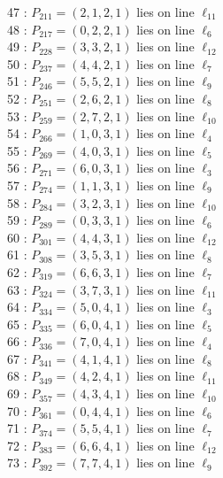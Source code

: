 \documentclass{article}
\begin{document}
{\begin{multicols}{2}
47 : $P_{211}=( 2, 1, 2, 1 )$ lies on line $\ell_{11}$\\
48 : $P_{217}=( 0, 2, 2, 1 )$ lies on line $\ell_{6}$\\
49 : $P_{228}=( 3, 3, 2, 1 )$ lies on line $\ell_{12}$\\
50 : $P_{237}=( 4, 4, 2, 1 )$ lies on line $\ell_{7}$\\
51 : $P_{246}=( 5, 5, 2, 1 )$ lies on line $\ell_{9}$\\
52 : $P_{251}=( 2, 6, 2, 1 )$ lies on line $\ell_{8}$\\
53 : $P_{259}=( 2, 7, 2, 1 )$ lies on line $\ell_{10}$\\
54 : $P_{266}=( 1, 0, 3, 1 )$ lies on line $\ell_{4}$\\
55 : $P_{269}=( 4, 0, 3, 1 )$ lies on line $\ell_{5}$\\
56 : $P_{271}=( 6, 0, 3, 1 )$ lies on line $\ell_{3}$\\
57 : $P_{274}=( 1, 1, 3, 1 )$ lies on line $\ell_{9}$\\
58 : $P_{284}=( 3, 2, 3, 1 )$ lies on line $\ell_{10}$\\
59 : $P_{289}=( 0, 3, 3, 1 )$ lies on line $\ell_{6}$\\
60 : $P_{301}=( 4, 4, 3, 1 )$ lies on line $\ell_{12}$\\
61 : $P_{308}=( 3, 5, 3, 1 )$ lies on line $\ell_{8}$\\
62 : $P_{319}=( 6, 6, 3, 1 )$ lies on line $\ell_{7}$\\
63 : $P_{324}=( 3, 7, 3, 1 )$ lies on line $\ell_{11}$\\
64 : $P_{334}=( 5, 0, 4, 1 )$ lies on line $\ell_{3}$\\
65 : $P_{335}=( 6, 0, 4, 1 )$ lies on line $\ell_{5}$\\
66 : $P_{336}=( 7, 0, 4, 1 )$ lies on line $\ell_{4}$\\
67 : $P_{341}=( 4, 1, 4, 1 )$ lies on line $\ell_{8}$\\
68 : $P_{349}=( 4, 2, 4, 1 )$ lies on line $\ell_{11}$\\
69 : $P_{357}=( 4, 3, 4, 1 )$ lies on line $\ell_{10}$\\
70 : $P_{361}=( 0, 4, 4, 1 )$ lies on line $\ell_{6}$\\
71 : $P_{374}=( 5, 5, 4, 1 )$ lies on line $\ell_{7}$\\
72 : $P_{383}=( 6, 6, 4, 1 )$ lies on line $\ell_{12}$\\
73 : $P_{392}=( 7, 7, 4, 1 )$ lies on line $\ell_{9}$\\

\end{multicols}}
\end{document}
